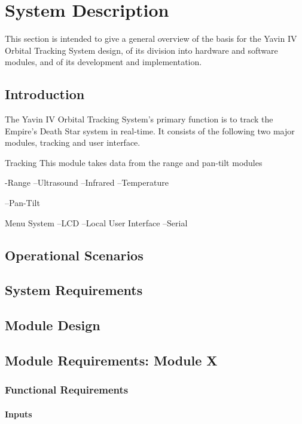 \documentclass[]{report}
\begin{document}
\chapter{System Description}
This section is intended to give a general overview of the basis for the Yavin IV Orbital Tracking System design, of its division into hardware and software modules, and of its development and implementation.  
\section{Introduction}

The Yavin IV Orbital Tracking System's primary function is to track the Empire's Death Star system in real-time. 
It consists of the following two major modules, tracking and user interface.

Tracking
This module takes data from the range and pan-tilt modules

-Range
--Ultrasound 
--Infrared
--Temperature

--Pan-Tilt

Menu System
--LCD
--Local User Interface
--Serial

\section{Operational Scenarios}

\section{System Requirements}

\section{Module Design}

\section{Module Requirements: Module X}
\subsection{Functional Requirements}
\subsubsection{Inputs}
\end{document}
